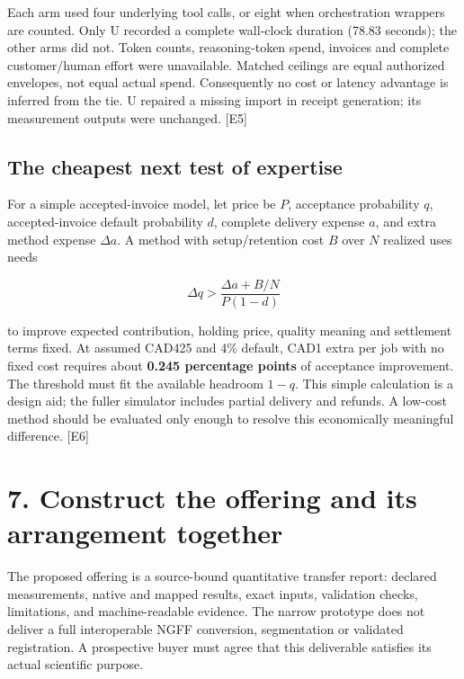 \documentclass[10pt,a4paper]{article}
\begin{document}
Each arm used four underlying tool calls, or eight when orchestration
wrappers are counted. Only U recorded a complete wall-clock duration
(78.83 seconds); the other arms did not. Token counts, reasoning-token
spend, invoices and complete customer/human effort were unavailable.
Matched ceilings are equal authorized envelopes, not equal actual spend.
Consequently no cost or latency advantage is inferred from the tie. U
repaired a missing import in receipt generation; its measurement outputs
were unchanged. {[}E5{]}

\hypertarget{the-cheapest-next-test-of-expertise}{%
\subsection{The cheapest next test of
expertise}\label{the-cheapest-next-test-of-expertise}}

For a simple accepted-invoice model, let price be \(P\), acceptance
probability \(q\), accepted-invoice default probability \(d\), complete
delivery expense \(a\), and extra method expense \(\Delta a\). A method
with setup/retention cost \(B\) over \(N\) realized uses needs

\[
\Delta q>\frac{\Delta a+B/N}{P(1-d)}
\]

to improve expected contribution, holding price, quality meaning and
settlement terms fixed. At assumed CAD425 and 4\% default, CAD1 extra
per job with no fixed cost requires about \textbf{0.245 percentage
points} of acceptance improvement. The threshold must fit the available
headroom \(1-q\). This simple calculation is a design aid; the fuller
simulator includes partial delivery and refunds. A low-cost method
should be evaluated only enough to resolve this economically meaningful
difference. {[}E6{]}

\clearpage

\hypertarget{construct-the-offering-and-its-arrangement-together}{%
\section{7. Construct the offering and its arrangement
together}\label{construct-the-offering-and-its-arrangement-together}}

The proposed offering is a source-bound quantitative transfer report:
declared measurements, native and mapped results, exact inputs,
validation checks, limitations, and machine-readable evidence. The
narrow prototype does not deliver a full interoperable NGFF conversion,
segmentation or validated registration. A prospective buyer must agree
that this deliverable satisfies its actual scientific purpose.
\end{document}
